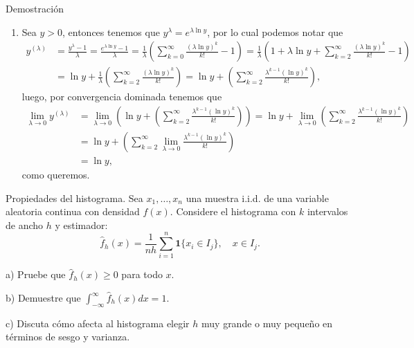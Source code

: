 \documentclass[a4paper,11pt]{article}
\providecommand{\paren}[1]{\ensuremath{\left(#1\right)}}
\begin{document}
\begin{demostracion}{Demostración}
    \renewcommand{\labelenumi}{\alph{enumi})}
    \begin{enumerate}
        \item Sea $y > 0$, entonces tenemos que $y^\lambda = e^{\lambda \ln{y}}$, por lo cual podemos notar que
              \begin{align*}
                  y^{(\lambda)} & = \frac{y^\lambda - 1}{\lambda} = \frac{e^{\lambda \ln{y}} -1 }{\lambda} = \frac{1}{\lambda} \paren{\sum_{k=0}^\infty \frac{\paren{\lambda \ln{y}}^k }{k!} -1} = \frac{1}{\lambda} \paren{ 1 + \lambda \ln{y} + \sum_{k=2}^\infty \frac{\paren{\lambda \ln{y}}^k }{k!} -1} \\
                                & = \ln{y} +  \frac{1}{\lambda} \paren{ \sum_{k=2}^\infty \frac{\paren{\lambda \ln{y}}^k }{k!}} = \ln{y} +   \paren{ \sum_{k=2}^\infty \frac{\lambda^{k-1} \paren{\ln{y}}^k }{k!}},
              \end{align*}
              luego, por convergencia dominada tenemos que
              \begin{align*}
                  \lim_{\lambda\to 0} y^{(\lambda)} & = \lim_{\lambda\to 0} \paren{\ln{y} +   \paren{ \sum_{k=2}^\infty \frac{\lambda^{k-1} \paren{\ln{y}}^k }{k!}}} = \ln{y} +  \lim_{\lambda\to 0} \paren{ \sum_{k=2}^\infty \frac{\lambda^{k-1} \paren{\ln{y}}^k }{k!}} \\
                                                    & = \ln{y} + \paren{ \sum_{k=2}^\infty \lim_{\lambda\to 0} \frac{\lambda^{k-1} \paren{\ln{y}}^k }{k!}}                                                                                                                 \\
                                                    & = \ln{y},
              \end{align*}
              como queremos.
    \end{enumerate}
\end{demostracion}
\newpage
\begin{ejercicio}{12}
    Propiedades del histograma. Sea $x_{1},\ldots,x_{n}$ una muestra i.i.d. de una variable aleatoria continua con densidad $f(x)$. Considere el histograma con $k$ intervalos de ancho $h$ y estimador:
    \[
        \hat{f}_{h}(x) = \frac{1}{nh} \sum_{i=1}^{n} \mathbf{1}\{x_i \in I_j\}, \quad x \in I_j.
    \]

    a) Pruebe que $\hat{f}_{h}(x) \geq 0$ para todo $x$.

    b) Demuestre que $\int_{-\infty}^{\infty} \hat{f}_{h}(x) dx = 1$.

    c) Discuta cómo afecta al histograma elegir $h$ muy grande o muy pequeño en términos de sesgo y varianza.
\end{ejercicio}
\end{document}
